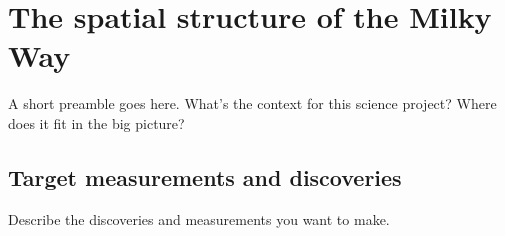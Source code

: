 %
%
%
%
%
%
%

\section{The spatial structure of the Milky Way}
\def\secname{MW_spatial_structure}\label{sec:\secname} %



A short preamble goes here. What's the context for this science
project? Where does it fit in the big picture?


\subsection{Target measurements and discoveries}
\label{sec:keyword:targets}

Describe the discoveries and measurements you want to make.

